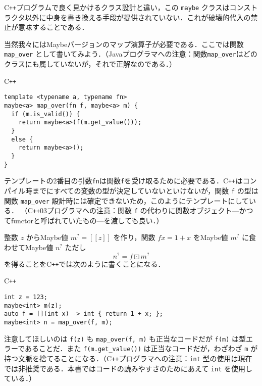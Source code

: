 \documentclass[a4paper,draft]{jsbook}
\def\[{\left[\!\left[}
\def\]{\right]\!\right]}
\newcommand{\programminglanguage}[1]{\textsf{#1}}
\newcommand{\cxx}{\programminglanguage{C}\texttt{++}}
\newcommand{\cxxzerothree}{\cxx\programminglanguage{03}}
\newcommand{\java}{\programminglanguage{Java}}
\newcommand{\code}[1]{\texttt{#1}}
\newenvironment{cxxcode}{\begin{itembox}[r]{\cxx}}{\end{itembox}}
\newcommand{\mMaybeWith}[1]{\[#1\]}
\newcommand{\mMaybe}[1]{{#1}^\text{?}}
\DeclareMathOperator{\mMapMaybe}{\boxdot}
\begin{document}
\cxx プログラムで良く見かけるクラス設計と違い，この \code{maybe} クラスはコンストラクタ以外に中身を書き換える手段が提供されていない．これが破壊的代入の禁止が意味することである．

当然我々にはMaybeバージョンのマップ演算子が必要である．ここでは関数 \code{map\_over} として書いてみよう．（\java プログラマへの注意：関数\code{map\_over}はどのクラスにも属していないが，それで正解なのである．）
\begin{cxxcode}
\begin{verbatim}
template <typename a, typename fn>
maybe<a> map_over(fn f, maybe<a> m) {
  if (m.is_valid()) {
    return maybe<a>(f(m.get_value()));
  }
  else {
    return maybe<a>();
  }
}
\end{verbatim}
\end{cxxcode}
テンプレートの2番目の引数\code{fn}は関数\code{f}を受け取るために必要である．\cxx はコンパイル時までにすべての変数の型が決定していないといけないが，関数 \code{f} の型は関数 \code{map\_over} 設計時には確定できないため，このようにテンプレートにしている．
（\cxxzerothree プログラマへの注意：関数 \code{f} の代わりに関数オブジェクト---かつてfunctorと呼ばれていたもの---を渡しても良い．）

整数 $z$ からMaybe値 $\mMaybe{m}=\mMaybeWith{z}$ を作り，関数 $fx=1+x$ をMaybe値 $\mMaybe{m}$ に食わせてMaybe値 $\mMaybe{n}$ ただし
\begin{equation}
\mMaybe{n}=f\mMapMaybe\mMaybe{m}
\end{equation}
を得ることを\cxx では次のように書くことになる．
\begin{cxxcode}
\begin{verbatim}
int z = 123;
maybe<int> m(z);
auto f = [](int x) -> int { return 1 + x; };
maybe<int> n = map_over(f, m);
\end{verbatim}
\end{cxxcode}
注意してほしいのは \code{f(z)} も \code{map\_over(f, m)} も正当なコードだが \code{f(m)} は型エラーであることだ．また \code{f(m.get\_value())} は正当なコードだが，わざわざ \code{m} が持つ文脈を捨てることになる．（\cxx プログラマへの注意：\code{int} 型の使用は現在では非推奨である．本書ではコードの読みやすさのためにあえて \code{int} を使用している．）

\end{document}

